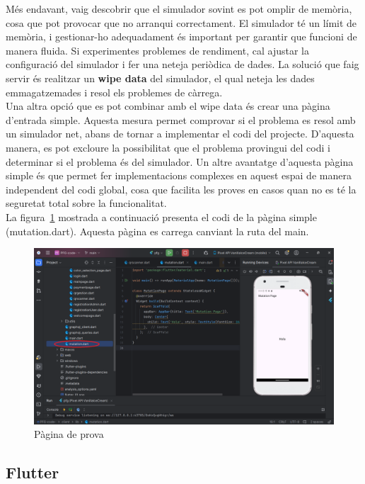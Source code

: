 \documentclass[a4paper,12pt,twoside]{ThesisStyle}
\begin{document}
Més endavant, vaig descobrir que el simulador sovint es pot omplir de memòria, cosa que pot provocar que no arranqui correctament. El simulador té un límit de memòria, i gestionar-ho adequadament és important per garantir que funcioni de manera fluida. Si experimentes problemes de rendiment, cal ajustar la configuració del simulador i fer una neteja periòdica de dades. La solució que faig servir és realitzar un \textbf{wipe data} del simulador, el qual neteja les dades emmagatzemades i resol els problemes de càrrega.\\


Una altra opció que es pot combinar amb el wipe data és crear una pàgina d'entrada simple. Aquesta mesura permet comprovar si el problema es resol amb un simulador net, abans de tornar a implementar el codi del projecte. D'aquesta manera, es pot excloure la possibilitat que el problema provingui del codi i determinar si el problema és del simulador. Un altre avantatge d'aquesta pàgina simple és que permet fer implementacions complexes en aquest espai de manera independent del codi global, cosa que facilita les proves en casos quan no es té la seguretat total sobre la funcionalitat.\\

La figura~\ref{fig: pàgina de prova} mostrada a continuació presenta el codi de la pàgina simple (mutation.dart). Aquesta pàgina es carrega canviant la ruta del main.

\begin{figure}[h]
    \centering
    \includegraphics[width=1\textwidth]{imatges/hola.png}
    \caption{Pàgina de prova}
    \label{fig: pàgina de prova}
\end{figure}

\subsection{Flutter}
\label{subsec: Flutter}
\end{document}
